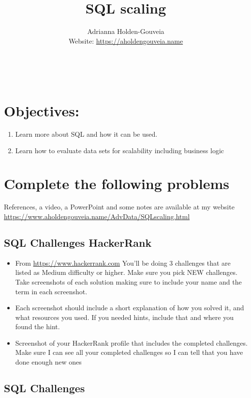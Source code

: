 \documentclass[12pt]{article}
\title{SQL scaling}
\author{
        Adrianna Holden-Gouveia \\
        Website: \url{https://aholdengouveia.name}\\ 
        \date{\vspace{-5ex}}
        \faLinkedin{: aholdengouveia} \\
        \faGithub {: aholdengouveia} \\
        }
\begin{document}
    

\maketitle


\section*{Objectives:}
\begin{enumerate}
    \item Learn more about SQL and how it can be used.
    \item Learn how to evaluate data sets for scalability including business logic
\end{enumerate}
\section*{Complete the following problems}

References, a video, a PowerPoint and some notes are available at my website
\url {https://www.aholdengouveia.name/AdvData/SQLscaling.html}

\subsection*{SQL Challenges HackerRank}

    \begin{itemize}
        \item From \url{https://www.hackerrank.com} You'll be doing 3 challenges that are listed as Medium difficulty or higher.  Make sure you pick NEW challenges. Take screenshots of each solution making sure to include your name and the term in each screenshot.
        \item Each screenshot should include a short explanation of how you solved it, and what resources you used.  If you needed hints, include that and where you found the hint. 
        \item Screenshot of your HackerRank profile that includes the completed challenges. Make sure I can see all your completed challenges so I can tell that you have done enough new ones
    \end{itemize}

\subsection*{SQL Challenges}
\end{document}
